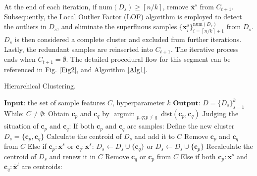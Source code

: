 \documentclass[final,3p,times]{elsarticle}
\begin{document}
At the end of each iteration, if $\text{num}(D_s){\ge}\left\lceil 
n/k\right\rceil$, remove $\bar{\boldsymbol{x}}^s$ from $C_{t+1}$. 
Subsequently, the Local Outlier Factor (LOF) algorithm \cite{bib53} is 
employed to detect the outliers in $D_s$, and eliminate the 
superfluous samples $\{\boldsymbol{x}^s_i\}_{i=\left\lceil n/k
\right\rceil+1}^{\text{num}(D_s)}$ from $D_s$. $D_s$ is then 
considered a complete cluster and excluded from further iterations.
 Lastly, the redundant samples are 
 reinserted into $C_{t+1}$. The iterative process ends when 
$C_{t+1}=\emptyset$. The detailed procedural flow for this 
 segment can be referenced in Fig. \ref{Fig2}, and Algorithm \ref{Alg1}.

 \begin{algorithm}
  \caption{Hierarchical Clustering.}\label{alg:alg1}
  \begin{algorithmic}
  \STATE 
  \STATE $\mathbf{Input}$: the set of sample features $C$, hyperparameter $k$
  \STATE $\mathbf{Output}$: $D=\{D_s\}_{s=1}^k$
  \vspace{5pt} %
  \STATE While: $C\neq\emptyset$:
  \STATE \hspace{0.5cm}Obtain $\boldsymbol{c}_p$ and $\boldsymbol{c}_q$ by $\mathop{\text{argmin}}_{\substack{p, q ; p \neq  {q}}}\text{dist}(\boldsymbol{c}_p,\boldsymbol{c}_q)$
  \STATE \hspace{0.5cm}Judging the situation of $\boldsymbol{c}_p$ and $\boldsymbol{c}_q$:
  \STATE \hspace{1.0cm}If both $\boldsymbol{c}_p$ and $\boldsymbol{c}_q$ are samples:
  \STATE \hspace{1.5cm}Define the new cluster $D_s=\{\boldsymbol{c}_p,\boldsymbol{c}_q\}$
  \STATE \hspace{1.5cm}Calculate the centroid of $D_s$ and add it to $C$
  \STATE \hspace{1.5cm}Remove $\boldsymbol{c}_p$ and $\boldsymbol{c}_q$ from $C$
  \STATE \hspace{1.0cm}Else if $\boldsymbol{c}_p:\bar{\boldsymbol{x}}^s$ or $\boldsymbol{c}_q:{\bar{\boldsymbol{x}}^s}$:
  \STATE \hspace{1.5cm}$D_s\leftarrow D_s {\cup} \{{\boldsymbol{c}}_q\}$ or $D_s\leftarrow D_s {\cup} \{{\boldsymbol{c}}_p\}$
  \STATE \hspace{1.5cm}Recalculate the centroid of $D_s$ and renew it in $C$
  \STATE \hspace{1.5cm}Remove $\boldsymbol{c}_q$ or $\boldsymbol{c}_p$ from $C$
  \STATE \hspace{1.0cm}Else if both $\boldsymbol{c}_p:{\bar{\boldsymbol{x}}^s}$ and $\boldsymbol{c}_q:{\bar{\boldsymbol{x}}^l}$ are centroids:

\end{algorithmic}
\end{algorithm}
\end{document}
